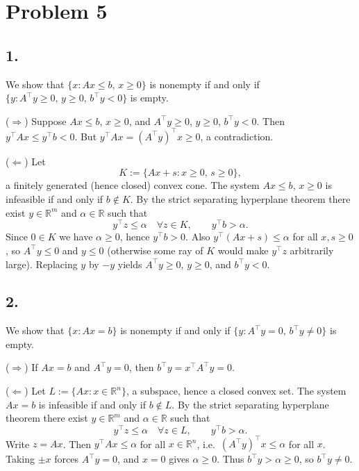 \documentclass[11pt]{article}
\begin{document}
\section*{Problem 5}

\subsection*{1.}

We show that $\{x:Ax\le b,\, x\ge 0\}$ is nonempty if and only if $\{y:A^\top y\ge 0,\, y\ge 0,\, b^\top y<0\}$ is empty.

($\Rightarrow$) Suppose $Ax\le b$, $x\ge 0$, and $A^\top y\ge 0$, $y\ge 0$, $b^\top y<0$. Then $y^\top Ax\le y^\top b<0$. But $y^\top Ax=(A^\top y)^\top x\ge 0$, a contradiction.

($\Leftarrow$) Let
\[
K := \{Ax+s : x\ge 0,\, s\ge 0\},
\]
a finitely generated (hence closed) convex cone. The system $Ax\le b$, $x\ge 0$ is infeasible if and only if $b\notin K$. By the strict separating hyperplane theorem there exist $y\in\mathbb{R}^m$ and $\alpha\in\mathbb{R}$ such that
\[
y^\top z\le \alpha \quad\forall z\in K, \qquad y^\top b>\alpha.
\]
Since $0\in K$ we have $\alpha\ge 0$, hence $y^\top b>0$. Also $y^\top(Ax+s)\le\alpha$ for all $x,s\ge 0$, so $A^\top y\le 0$ and $y\le 0$ (otherwise some ray of $K$ would make $y^\top z$ arbitrarily large). Replacing $y$ by $-y$ yields $A^\top y\ge 0$, $y\ge 0$, and $b^\top y<0$.

\subsection*{2.}

We show that $\{x:Ax=b\}$ is nonempty if and only if $\{y:A^\top y=0,\, b^\top y\neq 0\}$ is empty.

($\Rightarrow$) If $Ax=b$ and $A^\top y=0$, then $b^\top y=x^\top A^\top y=0$.

($\Leftarrow$) Let $L:=\{Ax:x\in\mathbb{R}^n\}$, a subspace, hence a closed convex set. The system $Ax=b$ is infeasible if and only if $b\notin L$. By the strict separating hyperplane theorem there exist $y\in\mathbb{R}^m$ and $\alpha\in\mathbb{R}$ such that
\[
y^\top z\le \alpha \quad\forall z\in L, \qquad y^\top b>\alpha.
\]
Write $z=Ax$. Then $y^\top Ax\le\alpha$ for all $x\in\mathbb{R}^n$, i.e.\ $(A^\top y)^\top x\le\alpha$ for all $x$. Taking $\pm x$ forces $A^\top y=0$, and $x=0$ gives $\alpha\ge 0$. Thus $b^\top y>\alpha\ge 0$, so $b^\top y\neq 0$.
\end{document}

